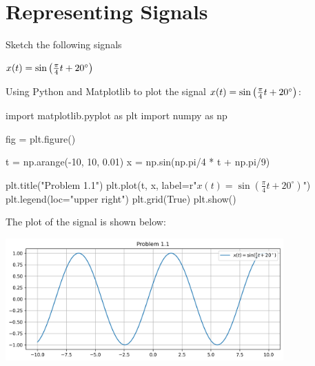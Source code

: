 \documentclass[a4paper, 10pt]{article}
\begin{document}
\subject[2110203 - Computer Engineering Mathematics II]


\section{Representing Signals}



\begin{problem}
Sketch the following signals
\end{problem}


\begin{tosubmit}
\begin{subproblems}
    \item \( x(t) = \sin \left(\frac{\pi}{4} t + 20^\circ\right) \)
\end{subproblems}

\par\noindent\submitsolution
Using Python and Matplotlib to plot the signal \( x(t) = \sin \left(\frac{\pi}{4} t + 20^\circ\right) \):
\begin{codingbox}
import matplotlib.pyplot as plt
import numpy as np

fig = plt.figure()

t = np.arange(-10, 10, 0.01)
x = np.sin(np.pi/4 * t + np.pi/9)

plt.title("Problem 1.1")
plt.plot(t, x, label=r"$x(t) = \sin(\frac{\pi}{4}t + 20^\circ)$")
plt.legend(loc="upper right")
plt.grid(True)
plt.show()
\end{codingbox}

The plot of the signal is shown below:
\begin{center}
    \includegraphics[width=0.8\textwidth]{images/problem_1_1.png}
\end{center}
\end{tosubmit}
\end{document}
